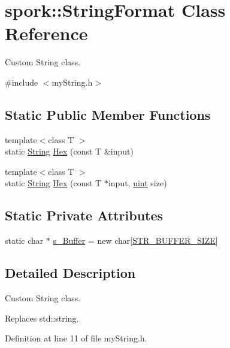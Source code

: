 \hypertarget{classspork_1_1_string_format}{}\section{spork\+:\+:String\+Format Class Reference}
\label{classspork_1_1_string_format}


Custom String class.  




{\ttfamily \#include $<$my\+String.\+h$>$}

\subsection*{Static Public Member Functions}
\begin{DoxyCompactItemize}
\item 
{\footnotesize template$<$class T $>$ }\\static \hyperlink{my_string_8h_afbeda3fd1bdc8c37d01bdf9f5c8274ff}{String} \hyperlink{classspork_1_1_string_format_afdb9679e5dfac5c93914c1ac1920cea2}{Hex} (const T \&input)
\item 
{\footnotesize template$<$class T $>$ }\\static \hyperlink{my_string_8h_afbeda3fd1bdc8c37d01bdf9f5c8274ff}{String} \hyperlink{classspork_1_1_string_format_ad6ecbe2bc49b48b0f0e1d0502c11d38b}{Hex} (const T $\ast$input, \hyperlink{defines_8h_a91ad9478d81a7aaf2593e8d9c3d06a14}{uint} size)
\end{DoxyCompactItemize}
\subsection*{Static Private Attributes}
\begin{DoxyCompactItemize}
\item 
static char $\ast$ \hyperlink{classspork_1_1_string_format_a79267c6edd1e417dc8c983c192b1987e}{s\+\_\+\+Buffer} = new char\mbox{[}\hyperlink{my_string_8h_a95e531d3a58c0adb143121e47391de94}{S\+T\+R\+\_\+\+B\+U\+F\+F\+E\+R\+\_\+\+S\+I\+ZE}\mbox{]}
\end{DoxyCompactItemize}


\subsection{Detailed Description}
Custom String class. 

Replaces std\+::string. 

Definition at line 11 of file my\+String.\+h.




